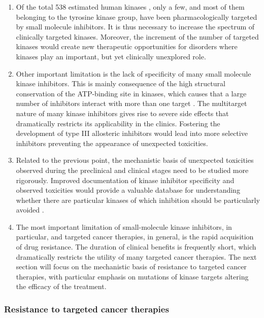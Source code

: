 \documentclass[11pt, b5paper,twoside]{tesi_upf}
\begin{document}
\begin{enumerate}

\item Of the total 538 estimated human kinases \cite{Manning2002}, only a few, and most of them belonging to the tyrosine kinase group, have been pharmacologically targeted by small molecule inhibitors. It is thus necessary to increase the spectrum of clinically targeted kinases. Moreover, the increment of the number of targeted kinases would create new therapeutic opportunities for disorders where kinases play an important, but yet clinically unexplored role. 
\item Other important limitation is the lack of specificity of many small molecule kinase inhibitors. This is mainly consequence of the high structural conservation of the ATP-binding site in kinases, which causes that a large number of inhibitors interact with more than one target \cite{Davis2011}. The multitarget nature of many kinase inhibitors gives rise to severe side effects that dramatically restricts its applicability in the clinics. Fostering the development of type III allosteric inhibitors would lead into more selective inhibitors preventing the appearance of unexpected toxicities.  
\item Related to the previous point, the mechanistic basis of unexpected toxicities observed during the preclinical and clinical stages need to be studied more rigorously. Improved documentation of kinase inhibitor specificity and observed toxicities would provide a valuable database for understanding whether there are particular kinases of which inhibition should be particularly avoided \cite{Zhang2009a}.
\item The most important limitation of small-molecule kinase inhibitors, in particular, and targeted cancer therapies, in general, is the rapid acquisition of drug resistance. The duration of clinical benefits is frequently short, which dramatically restricts the utility of many targeted cancer therapies. The next section will focus on the mechanistic basis of resistance to targeted cancer therapies, with particular emphasis on mutations of kinase targets altering the efficacy of the treatment.    
 \end{enumerate}
 


\subsubsection{Resistance to targeted cancer therapies}\label{resistance}
\end{document}
